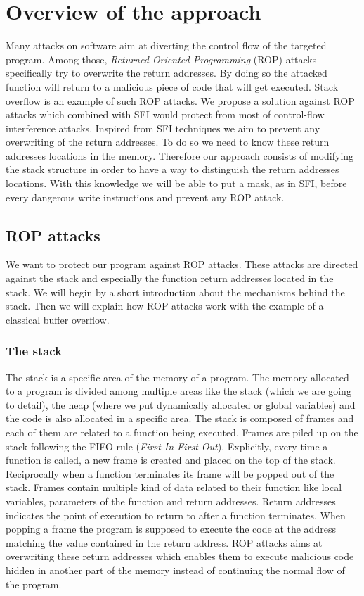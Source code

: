 \documentclass[11pt]{sdm}
\begin{document}
\newpage
\section{Overview of the approach}
\label{sec:Overview of the approach}
	Many attacks on software aim at diverting the control flow of the targeted program. Among those, \textit{Returned Oriented Programming} (ROP) attacks specifically try to overwrite the return addresses.
By doing so the attacked function will return to a malicious piece of code that will get executed.
Stack overflow is an example of such ROP attacks.
We propose a solution against ROP attacks which combined with SFI would protect from most of control-flow interference attacks.
Inspired from SFI techniques we aim to prevent any overwriting of the return addresses. To do so we need to know these return addresses locations in the memory. Therefore our approach consists of modifying the stack structure in order to have a way to distinguish the return addresses locations. With this knowledge we will be able to put a mask, as in SFI, before every dangerous write instructions and prevent any ROP attack.


\subsection{ROP attacks}
\label{sub:rop_attack}

	We want to protect our program against ROP attacks. These attacks are directed against the stack and especially the function return addresses located in the stack.
We will begin by a short introduction about the mechanisms behind the stack. Then we will explain how ROP attacks work with the example of a classical buffer overflow.

\subsubsection{The stack}
\label{ssub:The stack}
	The stack is a specific area of the memory of a program. The memory allocated to a program is divided among multiple areas like the stack (which we are going to detail), the heap (where we put dynamically allocated or global variables) and the code is also allocated in a specific area.
The stack is composed of frames and each of them are related to a function being executed. Frames are piled up on the stack following the FIFO rule (\textit{First In First Out}). Explicitly, every time a function is called, a new frame is created and placed on the top of the stack. Reciprocally when a function terminates its frame will be popped out of the stack.
Frames contain multiple kind of data related to their function like local variables, parameters of the function and return addresses. Return addresses indicates the point of execution to return to after a function terminates. When popping a frame the program is supposed to execute the code at the address matching the value contained in the return address.
ROP attacks aims at overwriting these return addresses which enables them to execute malicious code hidden in another part of the memory instead of continuing the normal flow of the program.
\end{document}
